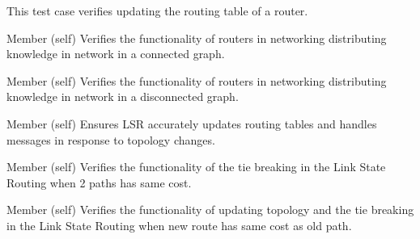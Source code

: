 \begin{DoxyRefList}
%
This test case verifies updating the routing table of a router.  
\item[Member \doxylink{classtest__lsr_1_1_test_link_state_acc1029fbd255c96d65f96701131e5a2a}{test\+\_\+lsr.Test\+Link\+State.test\+\_\+distribute\+\_\+all\+\_\+lsp\+\_\+connected\+\_\+graph} (self)]\label{test__test000007}%
%
Verifies the functionality of routers in networking distributing knowledge in network in a connected graph.  
\item[Member \doxylink{classtest__lsr_1_1_test_link_state_acf459bf23da7df09de8cf1b8f5608cd8}{test\+\_\+lsr.Test\+Link\+State.test\+\_\+distribute\+\_\+all\+\_\+lsp\+\_\+disconnected\+\_\+graph} (self)]\label{test__test000008}%
%
Verifies the functionality of routers in networking distributing knowledge in network in a disconnected graph.  
\item[Member \doxylink{classtest__lsr_1_1_test_link_state_af093ce910b4be941ef7e10b96cd82e1b}{test\+\_\+lsr.Test\+Link\+State.test\+\_\+ls\+\_\+algorithm\+\_\+single\+\_\+router} (self)]\label{test__test000011}%
%
Ensures LSR accurately updates routing tables and handles messages in response to topology changes. ~\newline
  
\item[Member \doxylink{classtest__lsr_1_1_test_link_state_ad4c04c827411a720179df65f790399f5}{test\+\_\+lsr.Test\+Link\+State.test\+\_\+tie\+\_\+break} (self)]\label{test__test000009}%
%
Verifies the functionality of the tie breaking in the Link State Routing when 2 paths has same cost.  
\item[Member \doxylink{classtest__lsr_1_1_test_link_state_a15bc630780ccb6445a53d1c58b4b6b9c}{test\+\_\+lsr.Test\+Link\+State.test\+\_\+tie\+\_\+break\+\_\+after\+\_\+changes} (self)]\label{test__test000010}%
%
Verifies the functionality of updating topology and the tie breaking in the Link State Routing when new route has same cost as old path. 
\end{DoxyRefList}